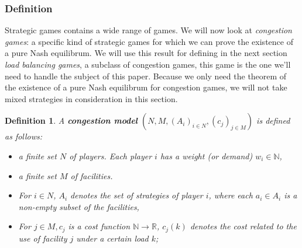 \documentclass[a4paper,11pt]{article}
\newtheorem{definition}[theorem]{Definition}
\newcommand{\N}{{\mathbb N}}
\newcommand{\R}{{\mathbb R}}
\begin{document}
\subsubsection{Definition}
Strategic games contains a wide range of games. We will now look at \emph{congestion games}: a specific kind of strategic games for which we can prove the existence of a pure Nash equilibrum. We will use this result for defining in the next section \emph{load balancing games}, a subclass of congestion games, this game is the one we'll need to handle the subject of this paper. Because we only need the theorem of the existence of a pure Nash equilibrum for congestion games, we will not take mixed strategies in consideration in this section.
\begin{definition}\cite{4,9}
A \textbf{congestion model} $(N, M, (A_i)_{i\in N}, (c_j)_{j\in M})$ is defined as follows:
\begin{itemize}
  \item a finite set $N$ of players. Each player $i$ has a weight (or demand) $w_i \in \N$,
  \item a finite set $M$ of facilities.
  \item For $i \in N$, $A_i$ denotes the set of strategies of player $i$, where each $a_i \in A_i$ is a non-empty subset of the facilities,
  \item For $j \in M, c_j$  is a cost function $\N \rightarrow \R$, $c_j(k)$ denotes the cost related to the use of facility $j$ under a certain load $k$;
\end{itemize}
\end{definition}
\end{document}
